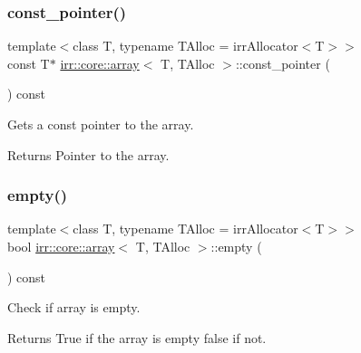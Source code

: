 \subsubsection{\texorpdfstring{const\+\_\+pointer()}{const\_pointer()}}
{\footnotesize\ttfamily template$<$class T, typename T\+Alloc = irr\+Allocator$<$\+T$>$$>$ \\
const T$\ast$ \hyperlink{classirr_1_1core_1_1array}{irr\+::core\+::array}$<$ T, T\+Alloc $>$\+::const\+\_\+pointer (\begin{DoxyParamCaption}{ }\end{DoxyParamCaption}) const\hspace{0.3cm}{\ttfamily [inline]}}



Gets a const pointer to the array. 

\begin{DoxyReturn}{Returns}
Pointer to the array. 
\end{DoxyReturn}
\mbox{\label{classirr_1_1core_1_1array_a956ee1019455016e21e218b61f6371ca}} 
\subsubsection{\texorpdfstring{empty()}{empty()}}
{\footnotesize\ttfamily template$<$class T, typename T\+Alloc = irr\+Allocator$<$\+T$>$$>$ \\
bool \hyperlink{classirr_1_1core_1_1array}{irr\+::core\+::array}$<$ T, T\+Alloc $>$\+::empty (\begin{DoxyParamCaption}{ }\end{DoxyParamCaption}) const\hspace{0.3cm}{\ttfamily [inline]}}



Check if array is empty. 

\begin{DoxyReturn}{Returns}
True if the array is empty false if not. 
\end{DoxyReturn}
\mbox{\label{classirr_1_1core_1_1array_a5ba14e37dddaecd9c3e813a78c157dc8}} 

